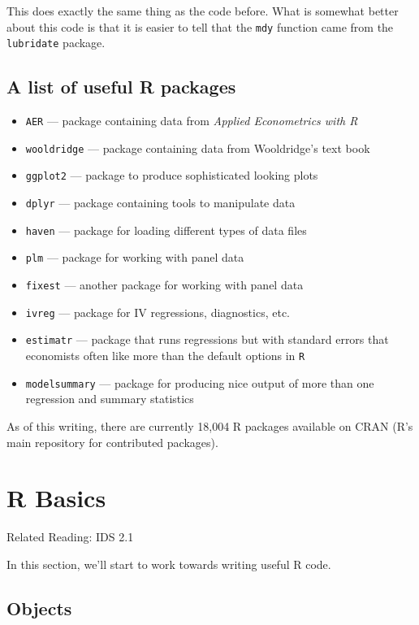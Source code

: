 \documentclass[
  letterpaper,
  DIV=11,
  numbers=noendperiod]{scrreprt}
\begin{document}
This does exactly the same thing as the code before. What is somewhat
better about this code is that it is easier to tell that the
\texttt{mdy} function came from the \texttt{lubridate} package.

\subsection{A list of useful R
packages}\label{a-list-of-useful-r-packages}

\begin{itemize}
\item
  \texttt{AER} --- package containing data from \emph{Applied
  Econometrics with R}
\item
  \texttt{wooldridge} --- package containing data from Wooldridge's text
  book
\item
  \texttt{ggplot2} --- package to produce sophisticated looking plots
\item
  \texttt{dplyr} --- package containing tools to manipulate data
\item
  \texttt{haven} --- package for loading different types of data files
\item
  \texttt{plm} --- package for working with panel data
\item
  \texttt{fixest} --- another package for working with panel data
\item
  \texttt{ivreg} --- package for IV regressions, diagnostics, etc.
\item
  \texttt{estimatr} --- package that runs regressions but with standard
  errors that economists often like more than the default options in
  \texttt{R}
\item
  \texttt{modelsummary} --- package for producing nice output of more
  than one regression and summary statistics
\end{itemize}

As of this writing, there are currently 18,004 R packages available on
CRAN (R's main repository for contributed packages).

\section{R Basics}\label{r-basics}

Related Reading: IDS 2.1

In this section, we'll start to work towards writing useful R code.

\subsection{Objects}\label{objects}
\end{document}
